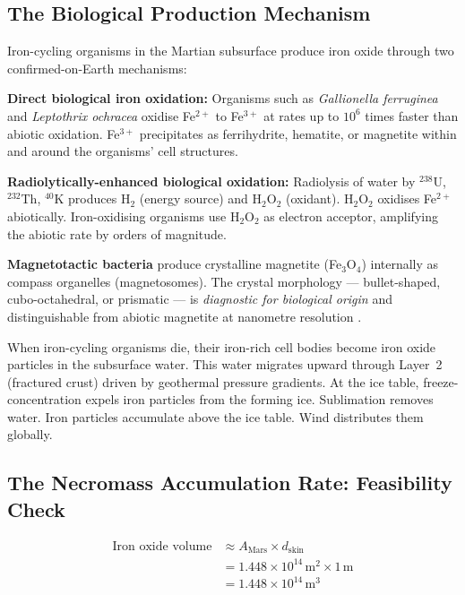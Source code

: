 \documentclass[11pt, a4paper]{article}
\begin{document}
\subsection{The Biological Production Mechanism}

Iron-cycling organisms in the Martian
subsurface produce iron oxide through
two confirmed-on-Earth mechanisms:

\textbf{Direct biological iron oxidation:}
Organisms such as \textit{Gallionella
ferruginea} and \textit{Leptothrix ochracea}
oxidise Fe$^{2+}$ to Fe$^{3+}$ at rates
up to $10^6$ times faster than abiotic
oxidation. Fe$^{3+}$ precipitates as
ferrihydrite, hematite, or magnetite
within and around the organisms'
cell structures.

\textbf{Radiolytically-enhanced biological
oxidation:} Radiolysis of water by
$^{238}$U, $^{232}$Th, $^{40}$K produces
H$_2$ (energy source) and H$_2$O$_2$
(oxidant). H$_2$O$_2$ oxidises Fe$^{2+}$
abiotically. Iron-oxidising organisms
use H$_2$O$_2$ as electron acceptor,
amplifying the abiotic rate by orders
of magnitude.

\textbf{Magnetotactic bacteria} produce
crystalline magnetite (Fe$_3$O$_4$)
internally as compass organelles
(magnetosomes). The crystal morphology
--- bullet-shaped, cubo-octahedral,
or prismatic --- is \emph{diagnostic for
biological origin} and distinguishable from
abiotic magnetite at nanometre resolution
\cite{magnetosomes}.

When iron-cycling organisms die, their
iron-rich cell bodies become iron oxide
particles in the subsurface water.
This water migrates upward through
Layer~2 (fractured crust) driven by
geothermal pressure gradients.
At the ice table, freeze-concentration
expels iron particles from the forming ice.
Sublimation removes water. Iron particles
accumulate above the ice table.
Wind distributes them globally.

\subsection{The Necromass Accumulation
Rate: Feasibility Check}

\begin{align}
\text{Iron oxide volume} &\approx
  A_{\text{Mars}} \times d_{\text{skin}} \nonumber \\
&= 1.448 \times 10^{14}\,\text{m}^2
  \times 1\,\text{m} \nonumber \\
&= 1.448 \times 10^{14}\,\text{m}^3
\end{align}
\end{document}
